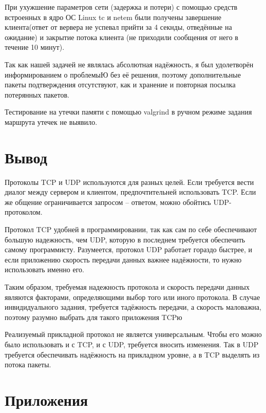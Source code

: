 \documentclass[a4paper]{article}
\begin{document}
При ухужшение параметров сети (задержка и потери) с помощью средств встроенных в ядро ОС Linux tc и netem были получены завершение клиента(ответ от вервера не успевал прийти за 4 секнды, отведённые на ожидание) и закрытие потока клиента (не приходили сообщения от него в течение 10 минут).

Так как нашей задачей не являлась абсолютная надёжность, я был удолетворён информированием о проблемыЮ без её решения, поэтому дополнительные пакеты подтверждения отсутствуют, как и хранение и повторная посылка потерянных пакетов.

Тестирование на утечки памяти с помощью valgrind в ручном режиме задания маршрута утечек не выявило.
\section{ Вывод}
Протоколы TCP и UDP используются для разных целей. Если требуется вести диалог между сервером и клиентом, предпочтительней использовать TCP. Если же общение ограничивается запросом – ответом, можно обойтись UDP-протоколом.

Протокол TCP удобней в программировании, так как сам по себе обеспечивают большую надежность, чем UDP, которую в последнем требуется обеспечить самому программисту. Разумеется, протокол UDP работает гораздо быстрее, и если приложению скорость передачи данных важнее надёжности, то нужно использовать именно его.
 
Таким образом,  требуемая надежность протокола и скорость передачи данных являются факторами, определяющими выбор того или иного протокола. В случае инвидидуального задания, требуется тадёжность передачи, а скорость маловажна, поэтому разумно выбрать для такого приложения TCPю

Реализуемый прикладной протокол не является универсальным. Чтобы его можно было использовать и с TCP, и с UDP, требуется вносить изменения. Так в UDP требуется обеспечивать надёжность на прикладном уровне, а в TCP выделять из потока пакеты.
\newpage
\section{Приложения}

















\end{document}
